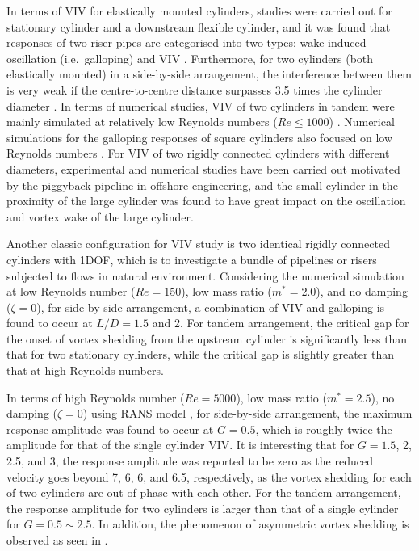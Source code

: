
 In terms of VIV for elastically mounted cylinders, studies were carried out for stationary cylinder and a downstream flexible cylinder, and it was found that responses of two riser pipes are categorised into two types: wake induced oscillation (i.e.\ galloping) and VIV \cite{Brika1999, fontaine2005riser}. Furthermore, for two cylinders (both elastically mounted) in a side-by-side arrangement, the interference between them is very weak if the centre-to-centre distance surpasses 3.5 times the cylinder diameter \cite{Huera-Huarte2011}. In terms of numerical studies, VIV of two cylinders in tandem were mainly simulated at relatively low Reynolds numbers ($Re \leq1000$) \cite{anagnostopoulos1998numerical,Mittal1999,Mittal2001,Mittal*2004,jester2004numerical,Sen2011}. Numerical simulations for the galloping responses of square cylinders also focused on low Reynolds numbers \cite{Sen2011,Joly2012}. For VIV of two rigidly connected cylinders with different diameters, experimental \cite{Zang2014} and numerical \cite{Rahmanian2014} studies have been carried out motivated by the piggyback pipeline in offshore engineering, and the small cylinder in the proximity of the large cylinder was found to have great impact on the oscillation and vortex wake of the large cylinder.
 
 
 Another classic configuration for VIV study is two identical rigidly connected cylinders with 1DOF, which is to investigate a bundle of pipelines or risers subjected to flows in natural environment. Considering the numerical simulation at low Reynolds number ($ Re=150 $), low mass ratio ($ m^*=2.0 $), and no damping ($ \zeta=0 $)\cite{Zhao2014b}, for side-by-side arrangement, a combination of VIV and galloping is found to occur at $ L/D = 1.5 $ and 2. For tandem arrangement, the critical gap for the onset of vortex shedding from the upstream cylinder is significantly less than that for two stationary cylinders, while the critical gap is slightly greater than that at high Reynolds numbers. 
 
 In terms of high Reynolds number ($ Re=5000 $), low mass ratio ($ m^*=2.5 $), no damping ($ \zeta=0 $) using RANS model \cite{zhao2016numerical}, for side-by-side arrangement, the maximum response amplitude was found to occur at $ G=0.5 $, which is roughly twice the amplitude for that of the single cylinder VIV. It is interesting that for $ G=1.5 $, 2, 2.5, and 3, the response amplitude was reported to be zero as the reduced velocity goes beyond 7, 6, 6, and 6.5, respectively, as the vortex shedding for each of two cylinders are out of phase with each other. For the tandem arrangement, the response amplitude for two cylinders is larger than that of a single cylinder for $ G= 0.5\sim2.5$. In addition, the phenomenon of asymmetric vortex shedding is observed as seen in .



